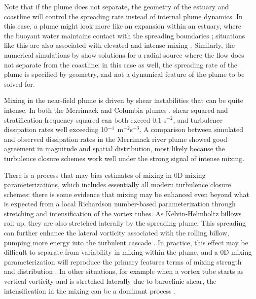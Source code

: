 \documentclass[12pt]{article}
\begin{document}
Note that if the plume does not separate, the geometry of the estuary and coastline will control the spreading rate instead of internal plume dynamics. In this case, a plume might look more like an expansion within an estuary, where the buoyant water maintains contact with the spreading boundaries \citep[see][]{geyer.ea:17}; situations like this are also associated with elevated and intense mixing \citep{geyer.ea:10}. Similarly, the numerical simulations by \citet{odonnell:90} show solutions for a radial source where the flow does not separate from the coastline; in this case as well, the spreading rate of the plume is specified by geometry, and not a dynamical feature of the plume to be solved for.


Mixing in the near-field plume is driven by shear instabilities that can be quite intense. In both the Merrimack \citep{macdonald.ea:07} and Columbia plumes \citep{nash.ea:09}, shear squared and stratification frequency squared can both exceed 0.1 s$^{-2}$, and turbulence dissipation rates well exceeding 10$^{-4}$~m$^{-2}$s$^{-3}$. A comparison between simulated and observed dissipation rates in the Merrimack river plume \citep{macdonald.ea:07} showed good agreement in magnitude and spatial distribution, most likely because the turbulence closure schemes work well under the strong signal of intense mixing. 

There is a process that may bias estimates of mixing in 0D mixing parameterizations, which includes essentially all modern turbulence closure schemes: there is some evidence that mixing may be enhanced even beyond what is expected from a local Richardson number-based parameterization through stretching and intensification of the vortex tubes. As Kelvin-Helmholtz billows roll up, they are also stretched laterally by the spreading plume. This spreading can further enhance the lateral vorticity associated with the rolling billow, pumping more energy into the turbulent cascade \citep{macdonald.chen:12}. In practice, this effect may be difficult to separate from variability in mixing within the plume, and a 0D mixing parameterization will reproduce the primary features terms of mixing strength and distribution \citep{macdonald.ea:07}. In other situations, for example when a vortex tube starts as vertical vorticity and is stretched laterally due to baroclinic shear, the intensification in the mixing can be a dominant process \citep[e.g.,][]{farmer.ea:02}.
\end{document}
